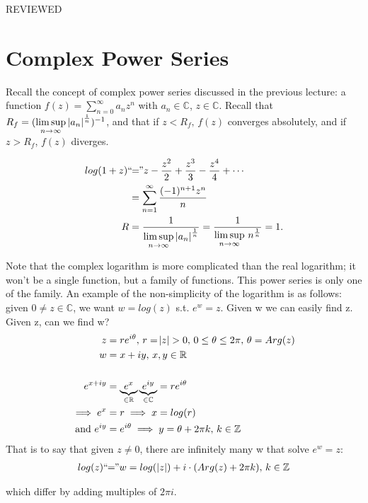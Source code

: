 
\setcounter{section}{0}
\setcounter{theorem}{0}


REVIEWED
\section{Complex Power Series}

Recall the concept of complex power series discussed in the previous lecture: a function $f(z) = \sum_{n=0}^\infty a_nz^n$ with $a_n \in \mathbb{C}$, $z\in \mathbb{C}$. Recall that $R_f=( \limsup\limits_{n\rightarrow \infty} \, \abs{a_n}^\frac{1}{n} )^{-1}$, and that if $z<R_f, \, f(z)$ converges absolutely, and if $z>R_f$, $f(z)$ diverges.

\begin{example}[Logarithm]
\begin{align*}
    log(1+z)  `` \! \! &= \! \!"  z - \frac{z^2}{2} +\frac{z^3}{3} - \frac{z^4}{4} + \cdots\\
    &= \sum_{n=1}^\infty \frac{(-1)^{n+1}z^n}{n}\\
    R&=\frac{1}{\limsup\limits_{n\rightarrow \infty} \, \abs{a_n}^\frac{1}{n}} = \frac{1}{\limsup\limits_{n\rightarrow \infty} \, n^\frac{1}{n}} = 1.
\end{align*}

Note that the complex logarithm is more complicated than the real logarithm; it won't be a single function, but a family of functions. This power series is only one of the family. An example of the non-simplicity of the logarithm is as follows: given $0 \neq z \in \mathbb{C}$, we want $w=log(z)$ s.t. $e^w=z$. Given w we can easily find z. Given z, can we find w?
\begin{align*}
    z&=re^{i\theta}, \, r=\abs{z}>0, \, 0 \leq \theta \leq 2\pi, \, \theta = Arg(z)\\
    w&=x+iy, \, x,y\in \mathbb{R}\\\\
    e^{x+iy} &= 
    \underbrace{e^x}_{\in \mathbb{R}} \underbrace{e^{iy}}_{\in \mathbb{C}} = re^{i\theta}\\ \implies e^x &=r \implies x=log(r)\\
   \text{and } e^{iy} &= e^{i\theta} \implies y = \theta +2\pi k, \, k\in \mathbb{Z}
\end{align*}
That is to say that given $z\neq 0$, there are infinitely many w that solve $e^w=z$:
\begin{align*}
    log(z) `` \! \! = \! \! " w = log ( \,  \abs{z} )  + i\cdot (Arg(z) +2\pi k), \, k\in \mathbb{Z}
\end{align*}


which differ by adding multiples of $2 \pi i$.
\end{example}

